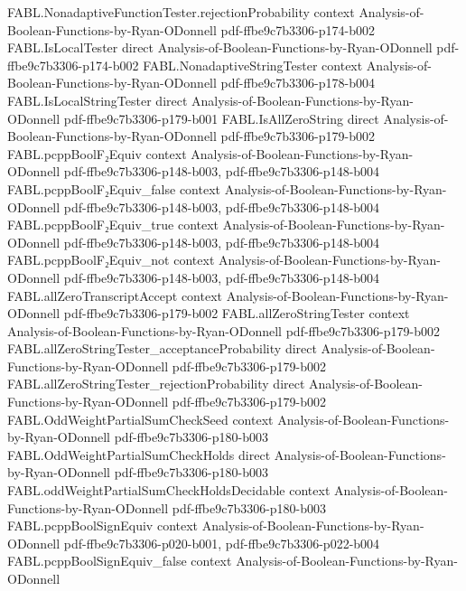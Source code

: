 \begin{theorem}
\proofstep
  {FABL.NonadaptiveFunctionTester.rejectionProbability}
  {context}
  {Analysis-of-Boolean-Functions-by-Ryan-ODonnell}
  {pdf-ffbe9c7b3306-p174-b002}
\proofstep
  {FABL.IsLocalTester}
  {direct}
  {Analysis-of-Boolean-Functions-by-Ryan-ODonnell}
  {pdf-ffbe9c7b3306-p174-b002}
\proofstep
  {FABL.NonadaptiveStringTester}
  {context}
  {Analysis-of-Boolean-Functions-by-Ryan-ODonnell}
  {pdf-ffbe9c7b3306-p178-b004}
\proofstep
  {FABL.IsLocalStringTester}
  {direct}
  {Analysis-of-Boolean-Functions-by-Ryan-ODonnell}
  {pdf-ffbe9c7b3306-p179-b001}
\proofstep
  {FABL.IsAllZeroString}
  {direct}
  {Analysis-of-Boolean-Functions-by-Ryan-ODonnell}
  {pdf-ffbe9c7b3306-p179-b002}
\proofstep
  {FABL.pcppBoolF₂Equiv}
  {context}
  {Analysis-of-Boolean-Functions-by-Ryan-ODonnell}
  {pdf-ffbe9c7b3306-p148-b003,
    pdf-ffbe9c7b3306-p148-b004}
\proofstep
  {FABL.pcppBoolF₂Equiv_false}
  {context}
  {Analysis-of-Boolean-Functions-by-Ryan-ODonnell}
  {pdf-ffbe9c7b3306-p148-b003,
    pdf-ffbe9c7b3306-p148-b004}
\proofstep
  {FABL.pcppBoolF₂Equiv_true}
  {context}
  {Analysis-of-Boolean-Functions-by-Ryan-ODonnell}
  {pdf-ffbe9c7b3306-p148-b003,
    pdf-ffbe9c7b3306-p148-b004}
\proofstep
  {FABL.pcppBoolF₂Equiv_not}
  {context}
  {Analysis-of-Boolean-Functions-by-Ryan-ODonnell}
  {pdf-ffbe9c7b3306-p148-b003,
    pdf-ffbe9c7b3306-p148-b004}
\proofstep
  {FABL.allZeroTranscriptAccept}
  {context}
  {Analysis-of-Boolean-Functions-by-Ryan-ODonnell}
  {pdf-ffbe9c7b3306-p179-b002}
\proofstep
  {FABL.allZeroStringTester}
  {context}
  {Analysis-of-Boolean-Functions-by-Ryan-ODonnell}
  {pdf-ffbe9c7b3306-p179-b002}
\proofstep
  {FABL.allZeroStringTester_acceptanceProbability}
  {direct}
  {Analysis-of-Boolean-Functions-by-Ryan-ODonnell}
  {pdf-ffbe9c7b3306-p179-b002}
\proofstep
  {FABL.allZeroStringTester_rejectionProbability}
  {direct}
  {Analysis-of-Boolean-Functions-by-Ryan-ODonnell}
  {pdf-ffbe9c7b3306-p179-b002}
\proofstep
  {FABL.OddWeightPartialSumCheckSeed}
  {context}
  {Analysis-of-Boolean-Functions-by-Ryan-ODonnell}
  {pdf-ffbe9c7b3306-p180-b003}
\proofstep
  {FABL.OddWeightPartialSumCheckHolds}
  {direct}
  {Analysis-of-Boolean-Functions-by-Ryan-ODonnell}
  {pdf-ffbe9c7b3306-p180-b003}
\proofstep
  {FABL.oddWeightPartialSumCheckHoldsDecidable}
  {context}
  {Analysis-of-Boolean-Functions-by-Ryan-ODonnell}
  {pdf-ffbe9c7b3306-p180-b003}
\proofstep
  {FABL.pcppBoolSignEquiv}
  {context}
  {Analysis-of-Boolean-Functions-by-Ryan-ODonnell}
  {pdf-ffbe9c7b3306-p020-b001,
    pdf-ffbe9c7b3306-p022-b004}
\proofstep
  {FABL.pcppBoolSignEquiv_false}
  {context}
  {Analysis-of-Boolean-Functions-by-Ryan-ODonnell}

\end{theorem}
